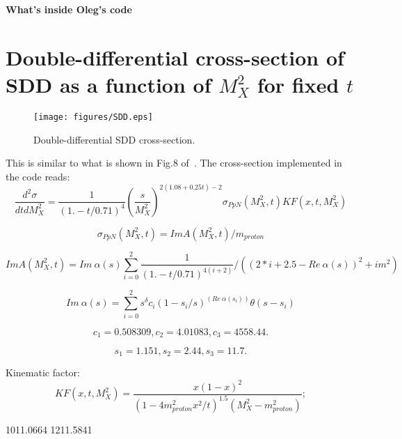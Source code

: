 \documentclass[12pt]{article}
\begin{document}
\vskip 0.5cm \centerline{\bf\Large What's inside Oleg's code}
\vskip 1cm

\section{Double-differential cross-section of SDD as a function of $M_X^2$ for fixed $t$}
\begin{figure}[!h]
\centering
\texttt{[image: figures/SDD.eps]}
\caption{Double-differential SDD cross-section.}
\label{fig:diagrams}
\end{figure}
This is similar to what is shown in Fig.8 of~\cite{Jenkovszky11}.
The cross-section implemented in the code reads:
$$
\frac{d^2\sigma}{dt dM_X^2}=\frac{1}{(1. - t/0.71)^4} \left(\frac{s}{M_X^2}\right)^{2(1.08 + 0.25t) - 2} \sigma_{PpN}(M_X^2,t) KF(x,t,M_X^2)
$$


$$
\sigma_{PpN}(M_X^2,t)=Im A(M_X^2,t) / m_{proton}
$$

$$
Im A(M_X^2,t) = Im\ \alpha(s) \sum_{i=0}^{2}\frac{1}{(1. - t/0.71)^{4(i+2)}} / ((2*i+2.5-Re\ \alpha(s))^2+im^2)
$$

$$
Im\ \alpha(s) = \sum_{i=0}^{2} s^\delta c_i (1-s_i/s)^(Re\ \alpha(s_i)) \theta(s-s_i) 
$$

$$
c_1=  0.508309,
c_2 = 4.01083,
c_3 = 4558.44.
$$
  
$$
s_1=  1.151,
s_2 = 2.44,
s_3 = 11.7.
$$

Kinematic factor:
$$
KF(x,t,M_X^2) = \frac{x (1-x)^2}{\left(1 - 4m_{proton}^2x^2/t\right)^{1.5}(M_X^2-m_{proton}^2)};
$$





\begin{thebibliography}{99}
 1011.0664
 1211.5841
\end{thebibliography}
\end{document}
